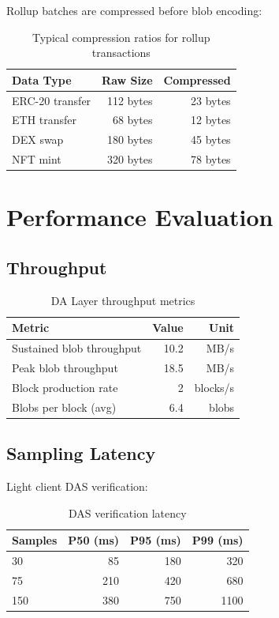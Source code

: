 \documentclass[11pt,a4paper]{article}
\begin{document}
Rollup batches are compressed before blob encoding:

\begin{table}[h]
\centering
\begin{tabular}{lrr}
\toprule
\textbf{Data Type} & \textbf{Raw Size} & \textbf{Compressed} \\
\midrule
ERC-20 transfer & 112 bytes & 23 bytes \\
ETH transfer & 68 bytes & 12 bytes \\
DEX swap & 180 bytes & 45 bytes \\
NFT mint & 320 bytes & 78 bytes \\
\bottomrule
\end{tabular}
\caption{Typical compression ratios for rollup transactions}
\end{table}

\section{Performance Evaluation}

\subsection{Throughput}

\begin{table}[h]
\centering
\begin{tabular}{lrr}
\toprule
\textbf{Metric} & \textbf{Value} & \textbf{Unit} \\
\midrule
Sustained blob throughput & 10.2 & MB/s \\
Peak blob throughput & 18.5 & MB/s \\
Block production rate & 2 & blocks/s \\
Blobs per block (avg) & 6.4 & blobs \\
\bottomrule
\end{tabular}
\caption{DA Layer throughput metrics}
\end{table}

\subsection{Sampling Latency}

Light client DAS verification:

\begin{table}[h]
\centering
\begin{tabular}{lrrr}
\toprule
\textbf{Samples} & \textbf{P50 (ms)} & \textbf{P95 (ms)} & \textbf{P99 (ms)} \\
\midrule
30 & 85 & 180 & 320 \\
75 & 210 & 420 & 680 \\
150 & 380 & 750 & 1100 \\
\bottomrule
\end{tabular}
\caption{DAS verification latency}
\end{table}
\end{document}
